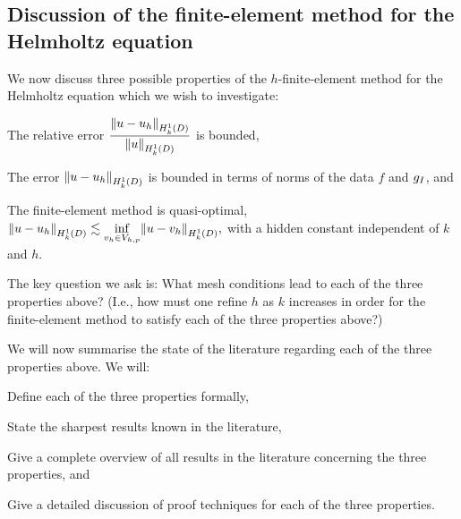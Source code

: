 
\subsection{Discussion of the finite-element method for the Helmholtz equation}\label{sec:helmfedisc}

We now discuss three possible properties of the $h$-finite-element method for the Helmholtz equation which we wish to investigate:
\bit
\item The relative error $\displaystyle \frac{\NHokD{u-\uh}}{\NHokD{u}}$ is bounded,
\item The error $\NHokD{u-\uh}$ is bounded in terms of norms of the data $f$ and $g_{I}$, and
  \item The finite-element method is quasi-optimal, $\displaystyle \NHokD{u-\uh} \lesssim \inf_{\vh \in \Vhp} \NHokD{u-\vh},$
    \eit
    with a hidden constant independent of $k$ and $h.$

    The key question we ask is: What mesh conditions lead to each of the three properties above? (I.e., how must one refine $h$ as $k$ increases in order for the finite-element method to satisfy each of the three properties above?)

    We will now summarise the state of the literature regarding each of the three properties above. We will:
    \ben
  \item Define each of the three properties formally,
  \item\label{it:sum2} State the sharpest results known in the literature,
  \item\label{it:sum3} Give a complete overview of all results in the literature concerning the three properties, and
    \item\label{it:sum4} Give a detailed discussion of proof techniques for each of the three properties.
      \een

